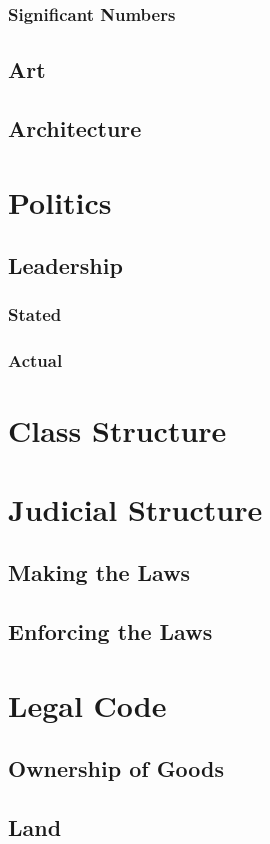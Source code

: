 \subsubsection{Significant Numbers}
\subsection{Art}
\subsection{Architecture}

\section{Politics}
\subsection{Leadership}
\subsubsection{Stated}
\subsubsection{Actual}


\section{Class Structure}

\section{Judicial Structure}
\subsection{Making the Laws}
\subsection{Enforcing the Laws}

\section{Legal Code}
\subsection{Ownership of Goods}
\subsection{Land}
